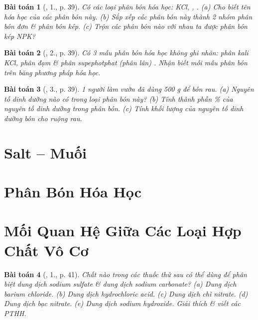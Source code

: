 \documentclass{article}
\newtheorem{baitoan}{Bài toán}
\begin{document}
\begin{baitoan}[\cite{SGK_Hoa_Hoc_9}, 1., p. 39]
	Có các loại phân bón hóa học: {\rm KCl, , }. (a) Cho biết tên hóa học của các phân bón này. (b) Sắp xếp các phân bón này thành 2 nhóm phân bón đơn \& phân bón kép. (c) Trộn các phân bón nào với nhau ta được phân bón kép NPK?
\end{baitoan}

\begin{baitoan}[\cite{SGK_Hoa_Hoc_9}, 2., p. 39]
	Có 3 mẫu phân bón hóa học không ghi nhãn: phân kali {\rm KCl}, phân đạm {\rm{}} \& phân supephotphat (phân lân) {\rm{}}. Nhận biết mỗi mẫu phân bón trên băng phương pháp hóa học.
\end{baitoan}

\begin{baitoan}[\cite{SGK_Hoa_Hoc_9}, 3., p. 39]
	1 người làm vườn đã dùng {\rm500 g } để bón rau. (a) Nguyên tố dinh dưỡng nào có trong loại phân bón này? (b) Tính thành phần \% của nguyên tố dinh dưỡng trong phân bón. (c) Tính khối lượng của nguyên tố dinh dưỡng bón cho ruộng rau.
\end{baitoan}


\section{Salt -- Muối}


\section{Phân Bón Hóa Học}


\section{Mối Quan Hệ Giữa Các Loại Hợp Chất Vô Cơ}

\begin{baitoan}[\cite{SGK_Hoa_Hoc_9}, 1., p. 41]
	Chất nào trong các thuốc thử sau có thể dùng để phân biệt dung dịch sodium sulfate \& dung dịch sodium carbonate? (a) Dung dịch barium chloride. (b) Dung dịch hydrochloric acid. (c) Dung dịch chì nitrate. (d) Dung dịch bạc nitrate. (e) Dung dịch sodium hydroxide. Giải thích \& viết các PTHH.
\end{baitoan}
\end{document}
